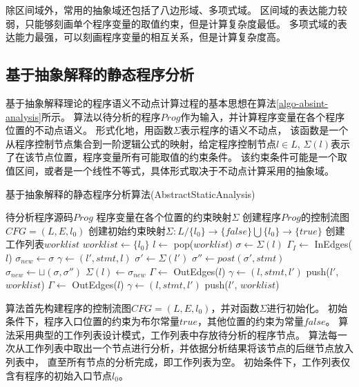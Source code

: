 除区间域外，常用的抽象域还包括了八边形域、多项式域。
区间域的表达能力较弱，只能够刻画单个程序变量的取值约束，但是计算复杂度最低。
多项式域的表达能力最强，可以刻画程序变量的相互关系，但是计算复杂度高。

\subsection{基于抽象解释的静态程序分析}

基于抽象解释理论的程序语义不动点计算过程的基本思想在算法\ref{algo-absint-analysis}所示。
算法以待分析的程序$Prog$作为输入，并计算程序变量在各个程序位置的不动点语义。
形式化地，用函数$\Sigma$表示程序的语义不动点，
该函数是一个从程序控制节点集合到一阶逻辑公式的映射，给定程序控制节点$l\in L$,
$\Sigma(l)$表示了在该节点位置，程序变量所有可能取值的约束条件。
该约束条件可能是一个取值区间，或者是一个线性不等式，具体形式取决于不动点计算采用的抽象域。


\begin{algorithm}[h]
\renewcommand{\algorithmicrequire}{\textbf{Input:}}
\renewcommand{\algorithmicensure}{\textbf{Output:}}
\caption{基于抽象解释的静态程序分析算法(AbstractStaticAnalysis)}
\label{algo-absint-analysis}
\begin{algorithmic}[1]
\REQUIRE 待分析程序源码$Prog$
\ENSURE 程序变量在各个位置的约束映射$\Sigma$
\STATE 创建程序$Prog$的控制流图$CFG=(L, E, l_0)$
\STATE 创建初始约束映射$\Sigma : L/\{l_0\} \rightarrow \{false\} \bigcup \{l_0\} \rightarrow \{true\}$
\STATE 创建工作列表$worklist$
\STATE $worklist \gets \{l_{0}\}$
	\STATE $l \gets $ pop($worklist$)
	\STATE $\sigma \gets \Sigma(l)$
		\STATE $\Gamma_I \gets $ InEdges($l$)
		\STATE $\sigma_{new} \gets \sigma$
			\STATE $\gamma \gets (l',stmt,l)$
			\STATE $\sigma' \gets \Sigma(l')$
			\STATE $\sigma'' \gets post(\sigma', stmt)$
			\STATE $\sigma_{new} \gets \sqcup(\sigma, \sigma'')$
		\ENDFOR
			\STATE $\Sigma(l) \gets \sigma_{new}$
			\STATE $\Gamma \gets $ OutEdges($l$)
			\FOR{$\gamma \in \Gamma$}
				\STATE $\gamma \gets (l, stmt, l')$
				\STATE push($l'$, $worklist$)
			\ENDFOR
		\ENDIF
	\ELSE
		\STATE $\Gamma \gets $ OutEdges($l$)
		\FOR{$\gamma \in \Gamma$}
			\STATE $\gamma \gets (l, stmt, l')$
			\STATE push($l'$, $worklist$)
		\ENDFOR
	\ENDIF
\ENDWHILE
\end{algorithmic}
\end{algorithm}

算法首先构建程序的控制流图$CFG=(L, E, l_0)$，并对函数$\Sigma$进行初始化。
初始条件下，程序入口位置的约束为布尔常量$true$，其他位置的约束为常量$false$。
算法采用典型的工作列表设计模式，工作列表中存放待分析的程序节点。
算法每一次从工作列表中取出一个节点进行分析，并依据分析结果将该节点的后继节点放入列表中，
直至所有节点的分析完成，即工作列表为空。
初始条件下，工作列表仅含有程序的初始入口节点$l_0$。


